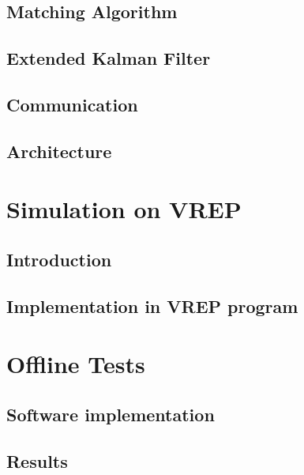 \documentclass{book} %
\begin{document}
\section{Matching Algorithm}


\section{Extended Kalman Filter}


\section{Communication}


\section{Architecture} \label{sec:SoftArch}



\chapter{Simulation on VREP}
\section{Introduction}


\section{Implementation in VREP program}


\chapter{Offline Tests}
\section{Software implementation}


\section{Results}

\end{document}

